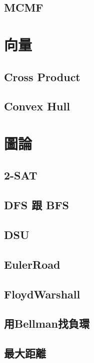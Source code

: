 \subsection{MCMF} 


\section{向量}
\subsection{Cross Product} 

\subsection{Convex Hull} 


\section{圖論}
\subsection{2-SAT} 

\subsection{DFS 跟 BFS} 

\subsection{DSU} 

\subsection{EulerRoad} 

\subsection{FloydWarshall} 

\subsection{用Bellman找負環} 

\subsection{最大距離} 

